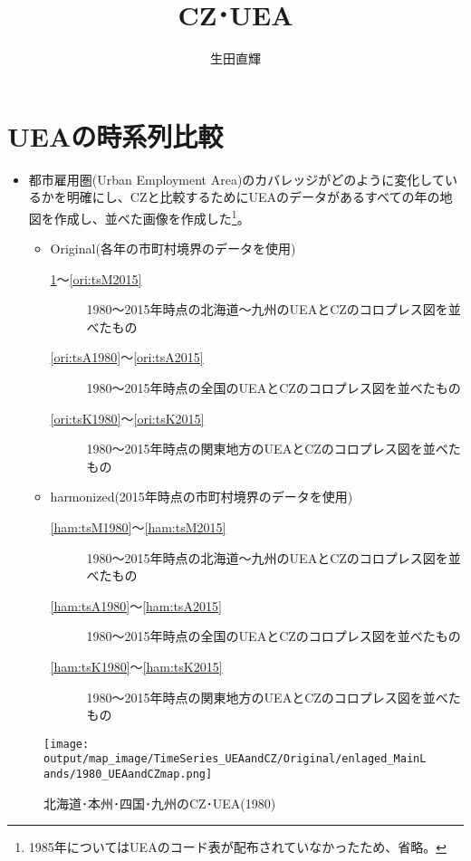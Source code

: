 \documentclass{ltjsarticle}
\title{CZ･UEA}
\author{生田直輝}
\begin{document}
\maketitle
\section{UEAの時系列比較}
\begin{itemize}
  \item 都市雇用圏(Urban Employment Area)のカバレッジがどのように変化しているかを明確にし、CZと比較するためにUEAのデータがあるすべての年の地図を作成し、並べた画像を作成した\footnote{1985年についてはUEAのコード表が配布されていなかったため、省略。}。
  \begin{itemize}
    \item Original(各年の市町村境界のデータを使用)
    \begin{description}
      \item[\ref{ori:tsM1980}～\ref{ori:tsM2015}] 1980～2015年時点の北海道～九州のUEAとCZのコロプレス図を並べたもの
      \item[\ref{ori:tsA1980}～\ref{ori:tsA2015}] 1980～2015年時点の全国のUEAとCZのコロプレス図を並べたもの
      \item[\ref{ori:tsK1980}～\ref{ori:tsK2015}] 1980～2015年時点の関東地方のUEAとCZのコロプレス図を並べたもの
    \end{description}

    \item harmonized(2015年時点の市町村境界のデータを使用)
    \begin{description}
      \item[\ref{ham:tsM1980}～\ref{ham:tsM2015}] 1980～2015年時点の北海道～九州のUEAとCZのコロプレス図を並べたもの
      \item[\ref{ham:tsA1980}～\ref{ham:tsA2015}] 1980～2015年時点の全国のUEAとCZのコロプレス図を並べたもの
      \item[\ref{ham:tsK1980}～\ref{ham:tsK2015}] 1980～2015年時点の関東地方のUEAとCZのコロプレス図を並べたもの
    \end{description}
  \end{itemize}
\end{itemize}

\begin{figure}[pbth]
  \centering
  \texttt{[image: output/map\_image/TimeSeries\_UEAandCZ/Original/enlaged\_MainLands/1980\_UEAandCZmap.png]}
  \caption{\label{ori:tsM1980}北海道･本州･四国･九州のCZ･UEA(1980)}
\end{figure}
\end{document}
